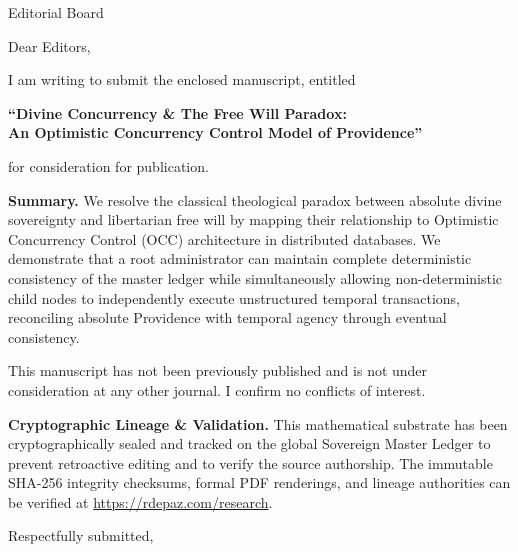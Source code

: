 \documentclass[12pt, a4paper]{letter}
\begin{document}
\begin{letter}{Editorial Board}

\opening{Dear Editors,}

I am writing to submit the enclosed manuscript, entitled

\begin{center}
\textbf{``Divine Concurrency \& The Free Will Paradox: \\ An Optimistic Concurrency Control Model of Providence''}
\end{center}

\noindent for consideration for publication.

\medskip

\textbf{Summary.} We resolve the classical theological paradox between absolute divine sovereignty and libertarian free will by mapping their relationship to Optimistic Concurrency Control (OCC) architecture in distributed databases. We demonstrate that a root administrator can maintain complete deterministic consistency of the master ledger while simultaneously allowing non-deterministic child nodes to independently execute unstructured temporal transactions, reconciling absolute Providence with temporal agency through eventual consistency.

\medskip

This manuscript has not been previously published and is not under consideration
at any other journal. I confirm no conflicts of interest.

\textbf{Cryptographic Lineage \& Validation.} This mathematical substrate has been cryptographically sealed and tracked on the global Sovereign Master Ledger to prevent retroactive editing and to verify the source authorship. The immutable SHA-256 integrity checksums, formal PDF renderings, and lineage authorities can be verified at \url{https://rdepaz.com/research}.

\medskip

\closing{Respectfully submitted,}
\end{letter}
\end{document}

